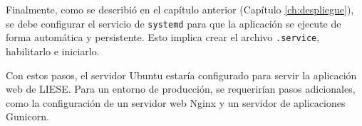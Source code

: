 Finalmente, como se describió en el capítulo anterior (Capítulo \ref{ch:despliegue}), se debe configurar el servicio de \texttt{systemd} para que la aplicación se ejecute de forma automática y persistente. Esto implica crear el archivo \texttt{.service}, habilitarlo e iniciarlo.

Con estos pasos, el servidor Ubuntu estaría configurado para servir la aplicación web de LIESE. Para un entorno de producción, se requerirían pasos adicionales, como la configuración de un servidor web Nginx y un servidor de aplicaciones Gunicorn.